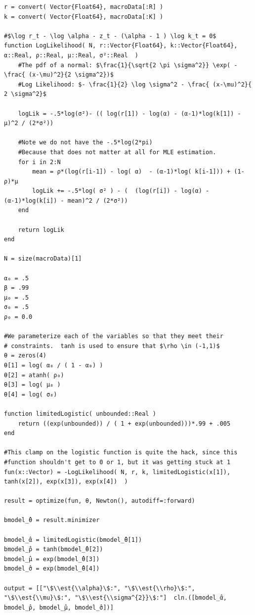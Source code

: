 \documentclass[12pt, letterpaper]{paper}
\begin{document}
\begin{verbatim}
r = convert( Vector{Float64}, macroData[:R] )
k = convert( Vector{Float64}, macroData[:K] )

#$\log r_t - \log \alpha - z_t - (\alpha - 1 ) \log k_t = 0$
function LogLikelihood( N, r::Vector{Float64}, k::Vector{Float64}, α::Real, ρ::Real, μ::Real, σ²::Real  )
    #The pdf of a normal: $\frac{1}{\sqrt{2 \pi \sigma^2}} \exp( - \frac{ (x-\mu)^2}{2 \sigma^2})$
    #Log Likelihood: $- \frac{1}{2} \log \sigma^2 - \frac{ (x-\mu)^2}{ 2 \sigma^2}$

    logLik = -.5*log(σ²)- (( log(r[1]) - log(α) - (α-1)*log(k[1]) - μ)^2 / (2*σ²))

    #Note we do not have the -.5*log(2*pi)
    #Because that does not matter at all for MLE estimation.
    for i in 2:N
        mean = ρ*(log(r[i-1]) - log( α)  - (α-1)*log( k[i-1])) + (1-ρ)*μ
        logLik += -.5*log( σ² ) - (  (log(r[i]) - log(α) - (α-1)*log(k[i]) - mean)^2 / (2*σ²))
    end

    return logLik
end

N = size(macroData)[1]

α₀ = .5
β = .99
μ₀ = .5
σ₀ = .5
ρ₀ = 0.0

#We parameterize each of the variables so that they meet their
# constraints.  tanh is used to ensure that $\rho \in (-1,1)$
θ = zeros(4)
θ[1] = log( α₀ / ( 1 - α₀) )
θ[2] = atanh( ρ₀)
θ[3] = log( μ₀ )
θ[4] = log( σ₀)

function limitedLogistic( unbounded::Real )
    return ((exp(unbounded)) / ( 1 + exp(unbounded)))*.99 + .005
end

#This clamp on the logistic function is quite the hack, since this
#function shouldn't get to 0 or 1, but it was getting stuck at 1
fun(x::Vector) = -LogLikelihood( N, r, k, limitedLogistic(x[1]), tanh(x[2]), exp(x[3]), exp(x[4])  )

result = optimize(fun, θ, Newton(), autodiff=:forward)

bmodel_̂θ = result.minimizer

bmodel_̂α = limitedLogistic(bmodel_̂θ[1])
bmodel_̂ρ = tanh(bmodel_̂θ[2])
bmodel_̂μ = exp(bmodel_̂θ[3])
bmodel_̂σ = exp(bmodel_̂θ[4])

output = [["\$\\est{\\alpha}\$:", "\$\\est{\\rho}\$:", "\$\\est{\\mu}\$:", "\$\\est{\\sigma^{2}}\$:"]  cln.([bmodel_̂α, bmodel_̂ρ, bmodel_̂μ, bmodel_̂σ])]
\end{verbatim}
\end{document}
